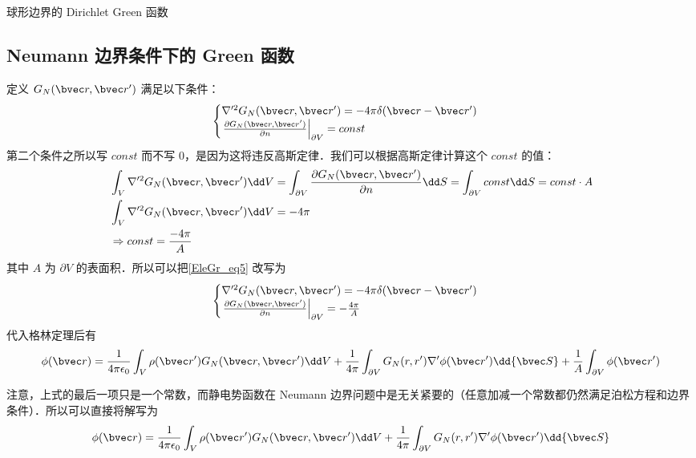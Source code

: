 \begin{example}{球形边界的 Dirichlet Green 函数}
\end{example}

\subsection{Neumann 边界条件下的 Green 函数}
定义 $G_N(\bvec r,\bvec r')$ 满足以下条件：
\begin{equation}\label{EleGr_eq5}
\begin{cases}
\nabla'^2G_N(\bvec r,\bvec r')=-4\pi\delta(\bvec r-\bvec r')\\
\left.\frac{\partial G_N(\bvec r,\bvec r')}{\partial n}\right|_{\partial V}=const
\end{cases}
\end{equation}
第二个条件之所以写 $const$ 而不写 $0$，是因为这将违反高斯定律．我们可以根据高斯定律计算这个 $const$ 的值：
\begin{equation}
\begin{aligned}
&\int_V \nabla'^2 G_N(\bvec r,\bvec r')\dd V=\int_{\partial V}\frac{\partial G_N(\bvec r,\bvec r')}{\partial n}\dd S=\int_{\partial V}const \dd S=const\cdot A\\
&\int_V \nabla'^2 G_N(\bvec r,\bvec r')\dd V=-4\pi\\
&\Rightarrow const=\frac{-4\pi}{A}
\end{aligned}
\end{equation}
其中 $A$ 为 $\partial V$ 的表面积．所以可以把\autoref{EleGr_eq5} 改写为
\begin{equation}
\begin{cases}
\nabla'^2G_N(\bvec r,\bvec r')=-4\pi\delta(\bvec r-\bvec r')\\
\left.\frac{\partial G_N(\bvec r,\bvec r')}{\partial n}\right|_{\partial V}=-\frac{4\pi}{A}
\end{cases}
\end{equation}
代入格林定理后有
\begin{equation}
\phi(\bvec r)=\frac{1}{4\pi\epsilon_0}\int_V \rho(\bvec r')G_N(\bvec r,\bvec r')\dd V+\frac{1}{4\pi}\int_{\partial V} G_N(r,r')\nabla'\phi(\bvec r')\dd {\bvec S}+\frac{1}{A}\int_{\partial V}\phi(\bvec r')
\end{equation}

注意，上式的最后一项只是一个常数，而静电势函数在 Neumann 边界问题中是无关紧要的（任意加减一个常数都仍然满足泊松方程和边界条件）．所以可以直接将解写为
\begin{equation}
\phi(\bvec r)=\frac{1}{4\pi\epsilon_0}\int_V \rho(\bvec r')G_N(\bvec r,\bvec r')\dd V+\frac{1}{4\pi}\int_{\partial V} G_N(r,r')\nabla'\phi(\bvec r')\dd {\bvec S}
\end{equation}
